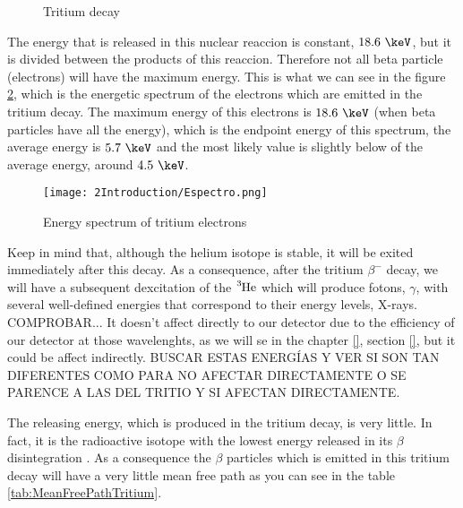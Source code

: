 \begin{figure}[hbtp]
 \centering
 \caption{Tritium decay}
 \label{fig:TritiumDecay}
\end{figure}

The energy that is released in this nuclear reaccion is constant, $18.6~\keV$, but it is divided between the products of this reaccion. Therefore not all beta particle (electrons) will have the maximum energy. This is what we can see in the figure \ref{fig:TritiumDecaySpectrum}, which is the energetic spectrum of the electrons which are emitted in the tritium decay. The maximum energy of this electrons is $18.6~\keV$ (when beta particles have all the energy), which is the endpoint energy of this spectrum, the average energy is $5.7~\keV$ and the most likely value is slightly below of the average energy, around $4.5~\keV$.

\begin{figure}[hbtp]
\texttt{[image: 2Introduction/Espectro.png]}
\centering
\caption{Energy spectrum of tritium electrons ~\cite{TesisTritio}\label{fig:TritiumDecaySpectrum}}
\end{figure}

Keep in mind that, although the helium isotope is stable, it will be exited immediately after this decay. As a consequence, after the tritium $\beta^-$ decay, we will have a subsequent dexcitation of the $\ce{^{3}He}$ which will produce fotons, $\gamma$, with several well-defined energies that correspond to their energy levels, X-rays. COMPROBAR... It doesn't affect directly to our detector due to the efficiency of our detector at those wavelenghts, as we will se in the chapter \ref{}, section \ref{},  but it could be affect indirectly. BUSCAR ESTAS ENERGÍAS Y VER SI SON TAN DIFERENTES COMO PARA NO AFECTAR DIRECTAMENTE O SE PARENCE A LAS DEL TRITIO Y SI AFECTAN DIRECTAMENTE.

The releasing energy, which is produced in the tritium decay, is very little. In fact, it is the radioactive isotope with the lowest energy released in its $\beta$ disintegration \cite{TritiumHandling}. As a consequence the $\beta$ particles which is emitted in this tritium decay will have a very little mean free path as you can see in the table \ref{tab:MeanFreePathTritium}.

